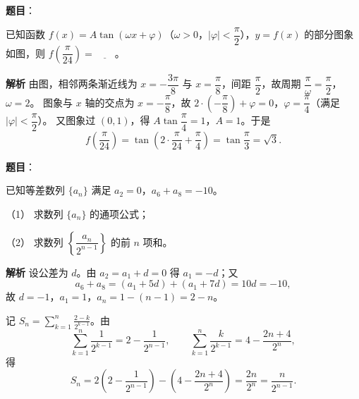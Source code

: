 \begin{answer}

\textbf{题目}：

已知函数 $f(x)=A\tan(\omega x+\varphi)$（$\omega>0$，$|\varphi|<\dfrac\pi2$），$y=f(x)$ 的部分图象如图，则 $f\left(\dfrac\pi{24}\right)=\underline{\qquad}$。
\nopagebreak[4]
\begin{center}\end{center}
\nopagebreak[4]
\textbf{解析}
由图，相邻两条渐近线为 $x=-\dfrac{3\pi}8$ 与 $x=\dfrac\pi8$，间距 $\dfrac\pi2$，故周期 $\dfrac\pi\omega=\dfrac\pi2$，$\omega=2$。
图象与 $x$ 轴的交点为 $x=-\dfrac\pi8$，故 $2\cdot\left(-\dfrac\pi8\right)+\varphi=0$，$\varphi=\dfrac\pi4$（满足 $|\varphi|<\dfrac\pi2$）。
又图象过 $(0,1)$，得 $A\tan\dfrac\pi4=1$，$A=1$。于是
\nopagebreak[4]
\[f\left(\frac\pi{24}\right)=\tan\left(2\cdot\frac\pi{24}+\frac\pi4\right)=\tan\frac\pi3=\sqrt3.\]


\end{answer}
\begin{answer}

\textbf{题目}：

已知等差数列 $\{a_n\}$ 满足 $a_2=0$，$a_6+a_8=-10$。

（1） 求数列 $\{a_n\}$ 的通项公式；

（2） 求数列 $\left\{\dfrac{a_n}{2^{n-1}}\right\}$ 的前 $n$ 项和。

\textbf{解析}
设公差为 $d$。由 $a_2=a_1+d=0$ 得 $a_1=-d$；又
\nopagebreak[4]
\[a_6+a_8=(a_1+5d)+(a_1+7d)=10d=-10,\]
故 $d=-1$，$a_1=1$，$a_n=1-(n-1)=2-n$。

记 $S_n=\displaystyle\sum_{k=1}^n\frac{2-k}{2^{k-1}}$。由
\nopagebreak[4]
\[\sum_{k=1}^n\frac1{2^{k-1}}=2-\frac1{2^{n-1}},\qquad
\sum_{k=1}^n\frac{k}{2^{k-1}}=4-\frac{2n+4}{2^n},\]
得
\nopagebreak[4]
\[S_n=2\left(2-\frac1{2^{n-1}}\right)-\left(4-\frac{2n+4}{2^n}\right)
=\frac{2n}{2^n}=\frac{n}{2^{n-1}}.\]



\end{answer}
